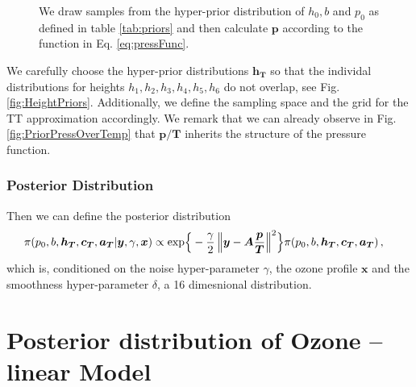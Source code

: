 \begin{figure}[ht!]
	\centering
	
	\caption[Prior Samples of $\bm{p}$ according to the respective hyper-prior distribution.]{We draw samples from the hyper-prior distribution of $h_0, b$ and $p_0$ as defined in table \ref{tab:priors} and then calculate $\bm{p}$ according to the function in Eq. \ref{eq:pressFunc}.}
	\label{fig:PriorPress}
\end{figure}


We carefully choose the hyper-prior distributions $\bm{h}_{\bm{T}} $ so that the individal distributions for heights $h_1, h_2, h_3, h_4,h_5,h_6$ do not overlap, see Fig. \ref{fig:HeightPriors}.
Additionally, we define the sampling space and the grid for the TT approximation accordingly.
We remark that we can already observe in Fig. \ref{fig:PriorPressOverTemp} that $\bm{p}/\bm{T}$ inherits the structure of the pressure function.

\subsubsection{Posterior Distribution}
Then we can define the posterior distribution
\begin{align}
		\pi(p_0,b,\bm{h_T},\bm{c_T},\bm{a_T} | \bm{y}, \gamma, \bm{x}) \propto  \exp\Bigl\{ & -\frac{\gamma}{2} \left\Vert \bm{y}- \bm{A} \frac{\bm{p}}{\bm{T}}  \right\Vert^2 \Bigr\} \pi(p_0,b,\bm{h_T},\bm{c_T},\bm{a_T})\, ,
\end{align}
which is, conditioned on the noise hyper-parameter $\gamma$, the ozone profile $\bm{x}$ and the smoothness hyper-parameter $\delta$, a 16 dimesnional distribution.
\clearpage


\section{Posterior distribution of Ozone -- linear Model}

